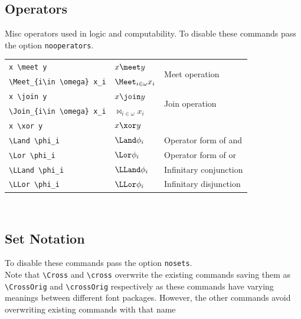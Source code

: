 \documentclass[leqno,11pt]{amsart}
\begin{document}
\subsection{Operators}
Misc operators used in logic and computability.  To disable these commands pass the option \verb=nooperators=.\\

\begin{tabular}{l |  l | l}\toprule
\verb=x \meet y= 				& \( x \meet y \) & \multirow{2}{*}{Meet operation} \\[6pt]
	\verb=\Meet_{i\in \omega} x_i=		& \( \Meet_{i\in \omega} x_i \) & \\ \midrule
	\verb=x \join y= 				& \(x  \join y \) & \multirow{2}{*}{Join operation}  \\[6pt]
	\verb=\Join_{i\in \omega} x_i=		& \( \Join_{i\in \omega} x_i \) & \\ \midrule
	\verb=x \xor y=						& \( x \xor y \)  & \\ \midrule
	\verb=\Land \phi_i=				& \( \Land \phi_i \) & Operator form of and\\ \midrule
	\verb=\Lor \phi_i=				& \( \Lor \phi_i \) & Operator form of or\\ \midrule
	\verb=\LLand \phi_i=				& \( \LLand \phi_i \) & Infinitary conjunction\\ \midrule
	\verb=\LLor \phi_i=				& \( \LLor \phi_i \) & Infinitary disjunction\\
	\bottomrule
\end{tabular}          \\	

\subsection{Set Notation}
To disable these commands pass the option \verb=nosets=.\\

Note that \verb=\Cross= and \verb=\cross= overwrite the existing commands saving them as \verb=\CrossOrig= and \verb=\crossOrig= respectively as these commands have varying meanings between different font packages.  However, the other commands avoid overwriting existing commands with that name 
\end{document}
